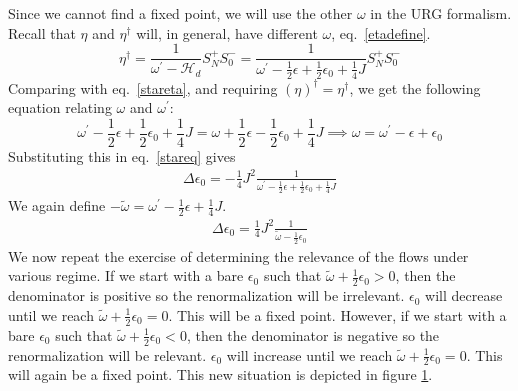 \documentclass[twoside]{report}
\numberwithin{equation}{section}
\begin{document}
\begin{figure}
	\label{star3}
\end{figure}
\\\\Since we cannot find a fixed point, we will use the other \(\omega\) in the URG formalism. Recall that \(\eta\) and \(\eta^\dagger\) will, in general, have different \(\omega\), eq.~\ref{etadefine}.
\begin{equation}
	\eta^\dagger = \frac{1}{\omega^\prime - \mathcal{H}_d}S_N^+ S_0^- = \frac{1}{\omega^\prime - \frac{1}{2}\epsilon + \frac{1}{2}\epsilon_0 + \frac{1}{4}J}S_N^+ S_0^-
\end{equation}
Comparing with eq.~\ref{stareta}, and requiring \(\left(\eta\right)^\dagger = \eta^\dagger\), we get the following equation relating \(\omega\) and \(\omega^\prime\):
\begin{equation}
	\omega^\prime - \frac{1}{2}\epsilon + \frac{1}{2}\epsilon_0 + \frac{1}{4}J = \omega + \frac{1}{2}\epsilon - \frac{1}{2}\epsilon_0 + \frac{1}{4}J \implies \omega = \omega^\prime - \epsilon + \epsilon_0
\end{equation}
Substituting this in eq.~\ref{stareq} gives
\begin{equation}\begin{aligned}
	\Delta \epsilon_0 = -\frac{1}{4}J^2 \frac{1}{\omega^\prime - \frac{1}{2}\epsilon + \frac{1}{2}\epsilon_0 + \frac{1}{4}J}
\end{aligned}\end{equation}
We again define \(-\tilde \omega = \omega^\prime - \frac{1}{2}\epsilon + \frac{1}{4}J\).
\begin{equation}\begin{aligned}
	\Delta \epsilon_0 = \frac{1}{4}J^2 \frac{1}{\tilde \omega - \frac{1}{2}\epsilon_0}
\end{aligned}\end{equation}
We now repeat the exercise of determining the relevance of the flows under various regime. If we start with a bare \(\epsilon_0\) such that \(\tilde \omega + \frac{1}{2}\epsilon_0 > 0\), then the denominator is positive so the renormalization will be irrelevant. \(\epsilon_0\) will decrease until we reach \(\tilde \omega + \frac{1}{2}\epsilon_0 = 0\). This will be a fixed point. However, if we start with a bare \(\epsilon_0\) such that \(\tilde \omega + \frac{1}{2}\epsilon_0 < 0\), then the denominator is negative so the renormalization will be relevant. \(\epsilon_0\) will increase until we reach \(\tilde \omega + \frac{1}{2}\epsilon_0 = 0\). This will again be a fixed point. This new situation is depicted in figure \ref{star3}.
\end{document}
